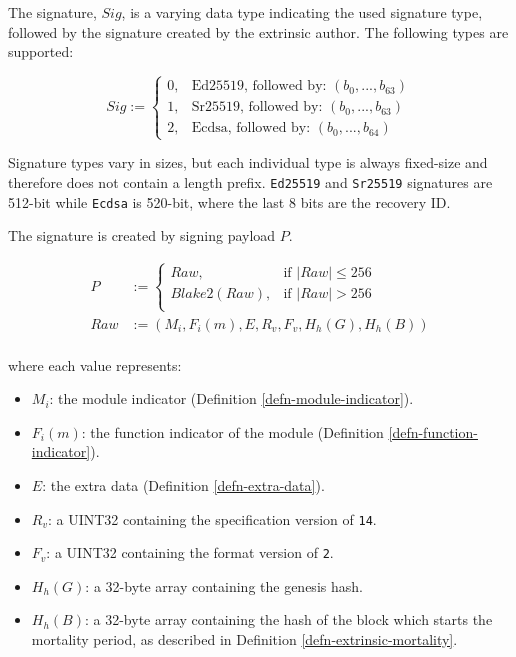 \begin{definition}
    \label{defn-extrinsic-signature}
    The signature, $Sig$, is a varying data type indicating the used signature
    type, followed by the signature created by the extrinsic author. The
    following types are supported:

    \[
        Sig :=
        \begin{cases}
        0, & \text{Ed25519, followed by: } (b_0, ...,b_{63}) \\
        1, & \text{Sr25519, followed by: } (b_0, ...,b_{63}) \\
        2, & \text{Ecdsa, followed by: } (b_0, ...,b_{64})
        \end{cases}
    \]

    Signature types vary in sizes, but each individual type is always fixed-size
    and therefore does not contain a length prefix. \verb|Ed25519| and
    \verb|Sr25519| signatures are 512-bit while \verb|Ecdsa| is 520-bit, where
    the last 8 bits are the recovery ID.
    \newline

    The signature is created by signing payload $P$.

    \begin{equation}
        \begin{aligned}
        P &:= \begin{cases}
            Raw, & \text{if } |Raw| \leq 256\\
            Blake2(Raw), & \text{if } |Raw| > 256\\
        \end{cases}\\
        Raw &:= (M_i, F_i(m), E, R_v, F_v, H_h(G), H_h(B))\\
        \end{aligned}
    \end{equation}

    where each value represents:
    \begin{itemize}
        \item $M_i$: the module indicator (Definition \ref{defn-module-indicator}).
        \item $F_i(m)$: the function indicator of the module
        (Definition \ref{defn-function-indicator}).
        \item $E$: the extra data (Definition \ref{defn-extra-data}).
        \item $R_v$: a UINT32 containing the specification version of \verb|14|.
        \item $F_v$: a UINT32 containing the format version of \verb|2|.
        \item $H_h(G)$: a 32-byte array containing the genesis hash.
        \item $H_h(B)$: a 32-byte array containing the hash of the block which
        starts the mortality period, as described in Definition
        \ref{defn-extrinsic-mortality}.
    \end{itemize}
\end{definition}

